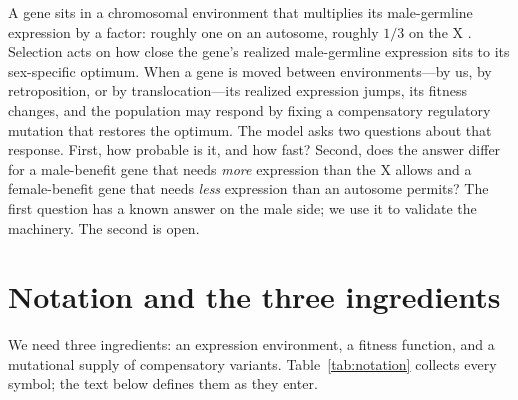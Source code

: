 \documentclass[11pt,a4paper]{article}
\begin{document}
A gene sits in a chromosomal environment that multiplies its male-germline expression by a factor: roughly one on an autosome, roughly $1/3$ on the X \citep{landeen2016}. Selection acts on how close the gene's realized male-germline expression sits to its sex-specific optimum. When a gene is moved between environments---by us, by retroposition, or by translocation---its realized expression jumps, its fitness changes, and the population may respond by fixing a compensatory regulatory mutation that restores the optimum. The model asks two questions about that response. First, how probable is it, and how fast? Second, does the answer differ for a male-benefit gene that needs \emph{more} expression than the X allows and a female-benefit gene that needs \emph{less} expression than an autosome permits? The first question has a known answer on the male side; we use it to validate the machinery. The second is open.

\section{Notation and the three ingredients}

We need three ingredients: an expression environment, a fitness function, and a mutational supply of compensatory variants. Table~\ref{tab:notation} collects every symbol; the text below defines them as they enter.
\end{document}
